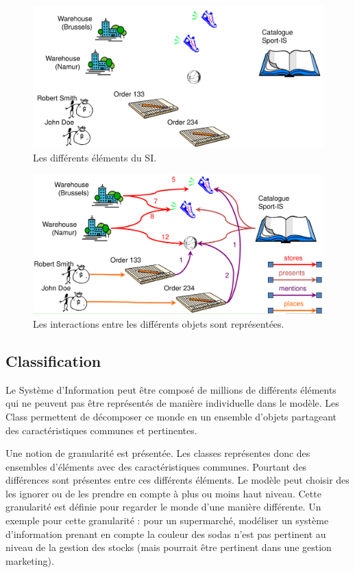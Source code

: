 \documentclass[../Syllabus.tex]{subfiles}
\begin{document}
\begin{figure}[htp]
    \centering
    \includegraphics[width=13cm]{./img/chapter2-step1.png}
    \caption{Les différents éléments du SI.}
    \label{fig:chapter2-step1}
\end{figure}

\begin{figure}[htp]
    \centering
    \includegraphics[width=13cm]{./img/chapter2-step2.png}
    \caption{Les interactions entre les différents objets sont représentées.}
    \label{fig:chapter2-step2}
\end{figure}

\subsection{Classification}

Le Système d'Information peut être composé de millions de différents éléments qui ne peuvent pas être représentés de manière individuelle dans le modèle. Les Class permettent de décomposer ce monde en un ensemble d'objets partageant des caractéristiques communes et pertinentes.

Une notion de granularité est présentée. Les classes représentes donc des ensembles d'éléments avec des caractéristiques communes. Pourtant des différences sont présentes entre ces différents éléments. Le modèle peut choisir des les ignorer ou de les prendre en compte à plus ou moins haut niveau. Cette granularité est définie pour regarder le monde d'une manière différente. Un exemple pour cette granularité : pour un supermarché, modéliser un système d'information prenant en compte la couleur des sodas n'est pas pertinent au niveau de la gestion des stocks (mais pourrait être pertinent dans une gestion marketing).
\end{document}
